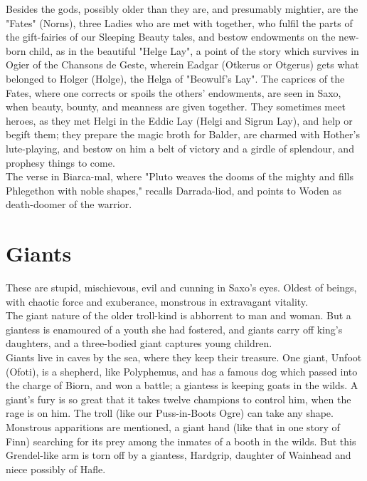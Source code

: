 \documentclass[10pt,a4paper]{report}
\begin{document}
Besides the gods, possibly older than they are, and presumably mightier, are the "Fates" (Norns), three Ladies who are met with together, who fulfil the parts of the gift-fairies of our Sleeping Beauty tales, and bestow endowments on the new-born child, as in the beautiful "Helge Lay", a point of the story which survives in Ogier of the Chansons de Geste, wherein Eadgar (Otkerus or Otgerus) gets what belonged to Holger (Holge), the Helga of "Beowulf's Lay". The caprices of the Fates, where one corrects or spoils the others' endowments, are seen in Saxo, when beauty, bounty, and meanness are given together. They sometimes meet heroes, as they met Helgi in the Eddic Lay (Helgi and Sigrun Lay), and help or begift them; they prepare the magic broth for Balder, are charmed with Hother's lute-playing, and bestow on him a belt of victory and a girdle of splendour, and prophesy things to come.\\

The verse in Biarca-mal, where "Pluto weaves the dooms of the mighty and fills Phlegethon with noble shapes," recalls Darrada-liod, and points to Woden as death-doomer of the warrior.

\section{Giants}
These are stupid, mischievous, evil and cunning in Saxo's eyes. Oldest of beings, with chaotic force and exuberance, monstrous in extravagant vitality.\\

The giant nature of the older troll-kind is abhorrent to man and woman. But a giantess is enamoured of a youth she had fostered, and giants carry off king's daughters, and a three-bodied giant captures young children.\\

Giants live in caves by the sea, where they keep their treasure. One giant, Unfoot (Ofoti), is a shepherd, like Polyphemus, and has a famous dog which passed into the charge of Biorn, and won a battle; a giantess is keeping goats in the wilds. A giant's fury is so great that it takes twelve champions to control him, when the rage is on him. The troll (like our Puss-in-Boots Ogre) can take any shape.\\

Monstrous apparitions are mentioned, a giant hand (like that in one story of Finn) searching for its prey among the inmates of a booth in the wilds. But this Grendel-like arm is torn off by a giantess, Hardgrip, daughter of Wainhead and niece possibly of Hafle.\\
\end{document}
